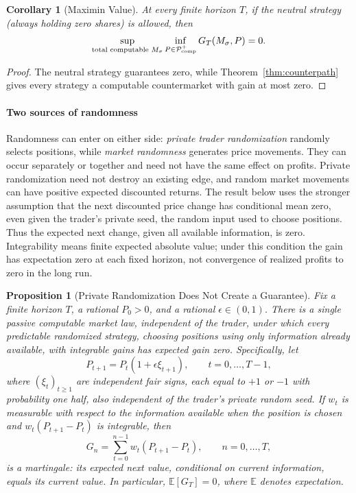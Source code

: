 \documentclass[aps,pra,reprint,superscriptaddress,amsmath,amssymb,floatfix]{revtex4-2}
\theoremstyle{plain}
\newtheorem{corollary}[theorem]{Corollary}
\newtheorem{proposition}[theorem]{Proposition}
\theoremstyle{definition}
\theoremstyle{remark}
\begin{document}
\begin{corollary}[Maximin Value]
  \label{cor:maximin}
  At every finite horizon \(T\), if the neutral strategy (always holding zero
  shares) is allowed, then
  \[
    \sup_{\text{\rm total computable }M_\sigma}
    \inf_{P\in\mathcal P_{\mathrm{comp}}^{+}}
    G_T(M_\sigma,P)=0.
  \]
\end{corollary}

\begin{proof}
The neutral strategy guarantees zero, while
Theorem~\ref{thm:counterpath} gives every strategy a computable countermarket
with gain at most zero.
\end{proof}

\paragraph{Two sources of randomness}

Randomness can enter on either side: \emph{private trader randomization}
randomly selects positions, while \emph{market randomness} generates price
movements. They can occur separately or together and need not have the same
effect on profits. Private randomization need not destroy an existing edge,
and random market movements can have positive expected discounted returns.
The result below uses the stronger assumption that the next discounted price
change has conditional mean zero, even given the trader's private seed, the
random input used to choose positions. Thus the expected next change, given
all available information, is zero. Integrability means finite expected
absolute value; under this condition the gain has expectation zero at each fixed horizon,
not convergence of realized profits to zero in the long run.

\begin{proposition}[Private Randomization Does Not Create a Guarantee]
  \label{prop:randomized}
  Fix a finite horizon \(T\), a rational \(P_0>0\), and a rational
  \(\epsilon\in(0,1)\). There is a single passive computable market law,
  independent of the trader, under which every predictable randomized strategy,
  choosing positions using only information already available, with integrable
  gains has expected gain zero. Specifically, let
  \[
    P_{t+1}=P_t(1+\epsilon\xi_{t+1}),
    \qquad t=0,\ldots,T-1,
  \]
  where \((\xi_t)_{t\geq1}\) are independent fair signs, each equal to \(+1\)
  or \(-1\) with probability one half, also independent of the trader's private
  random seed. If \(w_t\) is measurable with respect to
  the information available when the position is chosen and
  \(w_t(P_{t+1}-P_t)\) is integrable, then
  \[
    G_n=\sum_{t=0}^{n-1}w_t(P_{t+1}-P_t),
    \qquad n=0,\ldots,T,
  \]
  is a martingale: its expected next value, conditional on current information,
  equals its current value. In particular, \(\mathbb E[G_T]=0\), where
  \(\mathbb E\) denotes expectation.
\end{proposition}
\end{document}
